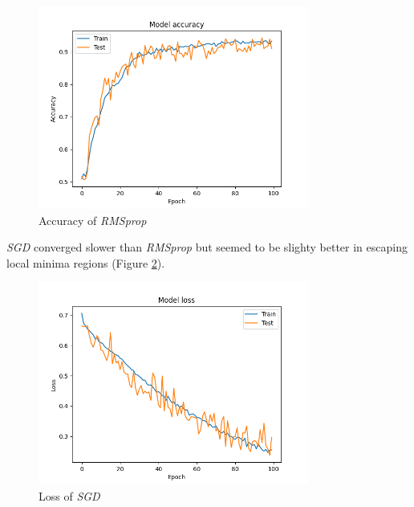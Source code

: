 \documentclass[compsoc]{IEEEtran}
\begin{document}
\begin{figure}[ht!]
\centering                                                                        
\includegraphics[width=3.5in]{../images/accuracy-4000-6-binary_crossentropy-rmsprop-100-4.png}
\captionsetup{justification=centering}                                                                                                                                   
\caption{Accuracy of \emph{RMSprop}}
\label{fig:r2}
\end{figure}


\emph{SGD} converged slower than \emph{RMSprop} but seemed to be slighty better in escaping local minima regions (Figure \ref{fig:s1}).


\begin{figure}[ht!]
\centering                                                                        
\includegraphics[width=3.5in]{../images/loss-4000-6-binary_crossentropy-sgd-100-4.png}
\captionsetup{justification=centering}                                                                                                                                   
\caption{Loss of \emph{SGD}}
\label{fig:s1}
\end{figure}
\end{document}
